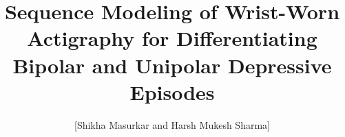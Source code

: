 \documentclass[runningheads]{llncs}
\begin{document}
\pagestyle{headings}
\mainmatter
\def\ECCV16SubNumber{***}

\title{Sequence Modeling of Wrist-Worn Actigraphy for Differentiating Bipolar and Unipolar Depressive Episodes}

\author{[Shikha Masurkar and Harsh Mukesh Sharma]}

\maketitle










\end{document}
